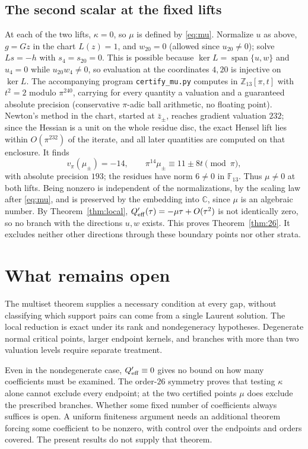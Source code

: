 \documentclass[11pt]{article}
\theoremstyle{remark}\newtheorem{remark}[theorem]{Remark}
\newcommand{\C}{\mathbb C}\newcommand{\Q}{\mathbb Q}
\newcommand{\F}{\mathbb F}\newcommand{\Z}{\mathbb Z}
\begin{document}
\subsection{The second scalar at the fixed lifts}
At each of the two lifts, $\kappa=0$, so $\mu$ is defined by \eqref{eq:mu}.
Normalize $u$ as above, $g=Gz$ in the chart $L(z)=1$, and $w_{20}=0$
(allowed since $u_{20}\ne0$); solve $Ls=-h$ with $s_4=s_{20}=0$. This is
possible because $\ker L=\operatorname{span}\{u,w\}$ and $u_4=0$ while $u_{20}w_4\ne0$,
so evaluation at the coordinates $4,20$ is injective on $\ker L$.
The accompanying program \texttt{certify\_mu.py} computes in
$\Z_{13}[\pi,t]$ with $t^2=2$ modulo $\pi^{240}$, carrying for every
quantity a valuation and a guaranteed absolute precision (conservative
$\pi$-adic ball arithmetic, no floating point). Newton's method in the chart,
started at $\bar z_\pm$, reaches gradient valuation $232$; since the
Hessian is a unit on the whole residue disc, the exact Hensel lift lies within
$O(\pi^{232})$ of the iterate, and all later quantities are computed on that
enclosure. It finds
\[
 v_\pi(\mu_\pm)=-14,\qquad \pi^{14}\mu_\pm\equiv 11\pm8t\pmod{\pi},
\]
with absolute precision $193$; the residues have norm $6\ne0$ in
$\F_{13}$. Thus $\mu\ne0$ at both lifts. Being nonzero is independent of
the normalizations, by the scaling law after \eqref{eq:mu}, and is preserved
by the embedding into $\C$, since $\mu$ is an algebraic number. By
Theorem~\ref{thm:local}, $Q_{\rm eff}'(\tau)=-\mu\tau+O(\tau^2)$ is not
identically zero, so no branch with the directions $u,w$ exists. This proves
Theorem~\ref{thm:26}. It excludes neither other directions through these
boundary points nor other strata.

\section{What remains open}
The multiset theorem supplies a necessary condition at every gap, without
classifying which support pairs can come from a single Laurent solution.
The local reduction is exact under its rank and nondegeneracy hypotheses.
Degenerate normal critical points, larger endpoint kernels, and branches
with more than two valuation levels require separate treatment.

Even in the nondegenerate case, $Q_{\rm eff}'\equiv0$ gives no bound
on how many coefficients must be examined. The order-$26$ symmetry proves
that testing $\kappa$ alone cannot exclude every endpoint; at the two
certified points $\mu$ does exclude the prescribed branches. Whether some
fixed number of coefficients always suffices is open. A uniform finiteness
argument needs an additional theorem forcing some coefficient to be
nonzero, with control over the endpoints and orders covered. The present
results do not supply that theorem.
\end{document}
